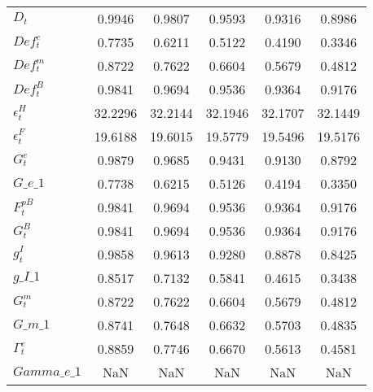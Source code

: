 \begin{center}
\begin{longtable}{lccccc}
$ D_t                       $	 & 	        0.9946	 & 	        0.9807	 & 	        0.9593	 & 	        0.9316	 & 	        0.8986 \\ 
$ Def^e_t                   $	 & 	        0.7735	 & 	        0.6211	 & 	        0.5122	 & 	        0.4190	 & 	        0.3346 \\ 
$ Def^m_t                   $	 & 	        0.8722	 & 	        0.7622	 & 	        0.6604	 & 	        0.5679	 & 	        0.4812 \\ 
$ Def^B_t                   $	 & 	        0.9841	 & 	        0.9694	 & 	        0.9536	 & 	        0.9364	 & 	        0.9176 \\ 
$ \epsilon^H_t              $	 & 	       32.2296	 & 	       32.2144	 & 	       32.1946	 & 	       32.1707	 & 	       32.1449 \\ 
$ \epsilon^F_t              $	 & 	       19.6188	 & 	       19.6015	 & 	       19.5779	 & 	       19.5496	 & 	       19.5176 \\ 
$ G^e_t                     $	 & 	        0.9879	 & 	        0.9685	 & 	        0.9431	 & 	        0.9130	 & 	        0.8792 \\ 
$G\_e\_1                    $	 & 	        0.7738	 & 	        0.6215	 & 	        0.5126	 & 	        0.4194	 & 	        0.3350 \\ 
$ F^{pB}_t                  $	 & 	        0.9841	 & 	        0.9694	 & 	        0.9536	 & 	        0.9364	 & 	        0.9176 \\ 
$ G^B_t                     $	 & 	        0.9841	 & 	        0.9694	 & 	        0.9536	 & 	        0.9364	 & 	        0.9176 \\ 
$ g^I_t                     $	 & 	        0.9858	 & 	        0.9613	 & 	        0.9280	 & 	        0.8878	 & 	        0.8425 \\ 
$g\_I\_1                    $	 & 	        0.8517	 & 	        0.7132	 & 	        0.5841	 & 	        0.4615	 & 	        0.3438 \\ 
$ G^m_t                     $	 & 	        0.8722	 & 	        0.7622	 & 	        0.6604	 & 	        0.5679	 & 	        0.4812 \\ 
$G\_m\_1                    $	 & 	        0.8741	 & 	        0.7648	 & 	        0.6632	 & 	        0.5703	 & 	        0.4835 \\ 
$ \Gamma^e_t                $	 & 	        0.8859	 & 	        0.7746	 & 	        0.6670	 & 	        0.5613	 & 	        0.4581 \\ 
$Gamma\_e\_1                $	 & 	           NaN	 & 	           NaN	 & 	           NaN	 & 	           NaN	 & 	           NaN \\ 

\end{longtable}
\end{center}

